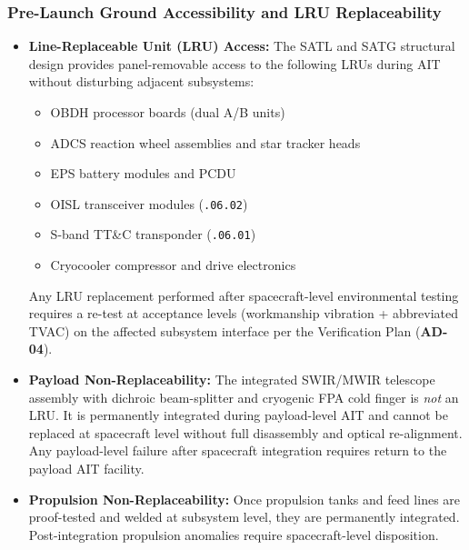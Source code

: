 \subsubsection{Pre-Launch Ground Accessibility and LRU Replaceability}

\begin{itemize}
    \item \textbf{Line-Replaceable Unit (LRU) Access:} The SATL and SATG structural design provides panel-removable access to the following LRUs during AIT without disturbing adjacent subsystems:
    \begin{itemize}
        \item OBDH processor boards (dual A/B units)
        \item ADCS reaction wheel assemblies and star tracker heads
        \item EPS battery modules and PCDU
        \item OISL transceiver modules (\texttt{.06.02})
        \item S-band TT\&C transponder (\texttt{.06.01})
        \item Cryocooler compressor and drive electronics
    \end{itemize}
    Any LRU replacement performed after spacecraft-level environmental testing requires a re-test at acceptance levels (workmanship vibration + abbreviated TVAC) on the affected subsystem interface per the Verification Plan (\textbf{AD-04}).
    \item \textbf{Payload Non-Replaceability:} The integrated SWIR/MWIR telescope assembly with dichroic beam-splitter and cryogenic FPA cold finger is \emph{not} an LRU. It is permanently integrated during payload-level AIT and cannot be replaced at spacecraft level without full disassembly and optical re-alignment. Any payload-level failure after spacecraft integration requires return to the payload AIT facility.
    \item \textbf{Propulsion Non-Replaceability:} Once propulsion tanks and feed lines are proof-tested and welded at subsystem level, they are permanently integrated. Post-integration propulsion anomalies require spacecraft-level disposition.
\end{itemize}
